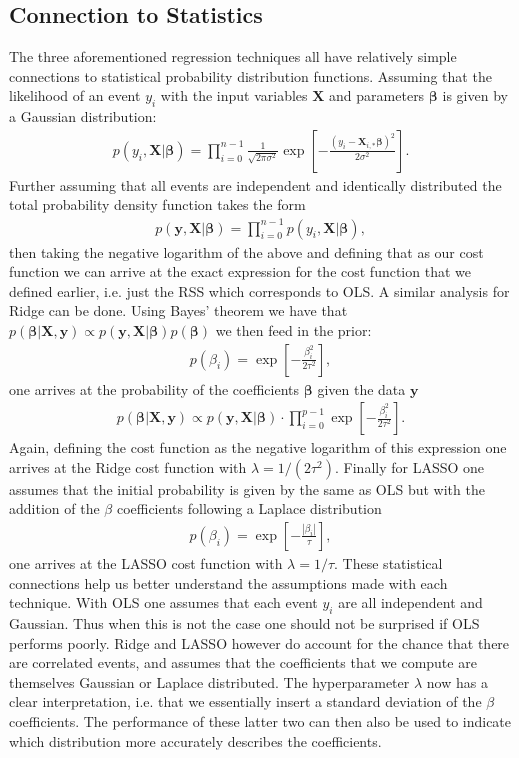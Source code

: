 \documentclass[%
reprint,
amsmath,amssymb,
aps,
pra,
]{revtex4-2}
\begin{document}
\subsection{Connection to Statistics}
The three aforementioned regression techniques all have relatively simple connections to statistical probability distribution functions. Assuming that the likelihood of an event $y_i$ with the input variables $\bm X$ and parameters $\bm\beta$ is given by a Gaussian distribution:
\begin{align}
	p(y_i,\bm X|\bm\beta)=\prod_{i=0}^{n-1}\frac{1}{\sqrt{2\pi\sigma^2}}\exp\left[-\frac{(y_i-\bm X_{i,*}\bm\beta)^2}{2\sigma^2}\right].
\end{align}
Further assuming that all events are independent and identically distributed the total probability density function takes the form
\begin{align}
	p(\bm y,\bm X|\bm\beta)=\prod_{i=0}^{n-1}p(y_i,\bm X|\bm\beta),
\end{align}
then taking the negative logarithm of the above and defining that as our cost function we can arrive at the exact expression for the cost function that we defined earlier, i.e. just the RSS which corresponds to OLS. A similar analysis for Ridge can be done. Using Bayes' theorem we have that $p(\bm\beta|\bm X,\bm y)\propto p(\bm y,\bm X|\bm\beta)p(\bm\beta)$ we then feed in the prior:
\begin{align}
	p(\beta_i)=\exp\left[-\frac{\beta_i^2}{2\tau^2}\right],
\end{align}
one arrives at the probability of the coefficients $\bm\beta$ given the data $\bm y$
\begin{align}
	p(\bm\beta|\bm X,\bm y)\propto p(\bm y,\bm X|\bm\beta)\cdot\prod_{i=0}^{p-1}\exp\left[-\frac{\beta_i^2}{2\tau^2}\right].
\end{align}
Again, defining the cost function as the negative logarithm of this expression one arrives at the Ridge cost function with $\lambda=1/(2\tau^2)$. Finally for LASSO one assumes that the initial probability is given by the same as OLS but with the addition of the $\beta$ coefficients following a Laplace distribution
\begin{align}
	p(\beta_i)=\exp\left[-\frac{|\beta_i|}{\tau}\right],
\end{align}
one arrives at the LASSO cost function with $\lambda=1/\tau$. These statistical connections help us better understand the assumptions made with each technique. With OLS one assumes that each event $y_i$ are all independent and Gaussian. Thus when this is not the case one should not be surprised if OLS performs poorly. Ridge and LASSO however do account for the chance that there are correlated events, and assumes that the coefficients that we compute are themselves Gaussian or Laplace distributed. The hyperparameter $\lambda$ now has a clear interpretation, i.e. that we essentially insert a standard deviation of the $\beta$ coefficients. The performance of these latter two can then also be used to indicate which distribution more accurately describes the coefficients.
\end{document}
